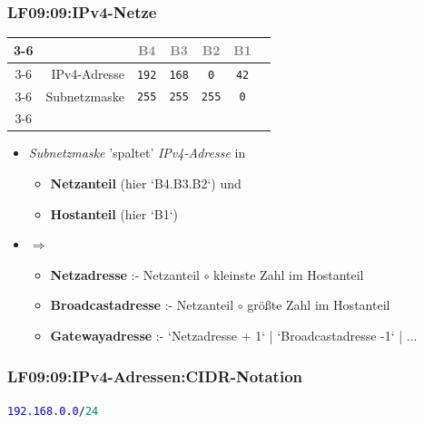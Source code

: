 \begin{frame}[fragile]  
  \frametitle{LF09:09:IPv4-Netze}
  \vspace{0.2cm}
  \begin{footnotesize}
  \begin{center}
    \renewcommand{\arraystretch}{1.3}
    \begin{tabular}{cr|c|c|c|c|c|}
    \cline{3-6}
    & &  \textcolor{gray}{\tiny{B4}} & \textcolor{gray}{\tiny{B3}} & \textcolor{gray}{\tiny{B2}} 
    &  \textcolor{gray}{\tiny{B1}}  \\
	  \cline{3-6}
	  & IPv4-Adresse & \texttt{192} & \texttt{168} & \texttt{0} & \texttt{42} \\
    \cline{3-6}
    & Subnetzmaske & \texttt{255} & \texttt{255} & \texttt{255} & \texttt{0}\\
    \cline{3-6}
  \end{tabular}
\end{center}


\vspace{0.2cm}

  \begin{itemize}
    \item \textit{Subnetzmaske} 'spaltet' \textit{IPv4-Adresse} in 

    \begin{itemize}
      \item \footnotesize{\textbf{Netzanteil} (hier `B4.B3.B2`) und}
      \item \textbf{Hostanteil} (hier `B1`)
    \end{itemize}
    \item $\Rightarrow$
    \begin{itemize}
      \item \textbf{Netzadresse} :- Netzanteil $\circ$ kleinste Zahl im Hostanteil 
      \item \textbf{Broadcastadresse} :-  Netzanteil $\circ$  größte Zahl im Hostanteil 
      \item \textbf{Gatewayadresse}  :- `Netzadresse + 1`  | `Broadcastadresse -1` | ...
    \end{itemize}
  \end{itemize}
\end{footnotesize}
\end{frame}


\begin{frame}[fragile]  
  \frametitle{LF09:09:IPv4-Adressen:CIDR-Notation}

  \vspace{1cm}
\begin{center}
\huge{
  \texttt{\textcolor{blue}{192.168.0.0}/\textcolor{teal}{24}}
}
\end{center}

\end{frame}

